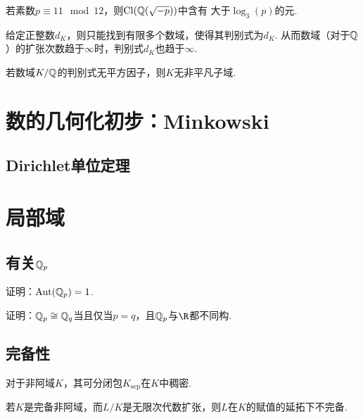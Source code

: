 \begin{exercise}
    若素数$p \equiv 11 \mod 12$，则$\mathrm{Cl}(\mathbb{Q}(\sqrt{-p}))$中含有
    大于$\log_{3}(p)$的元.
\end{exercise}

\begin{exercise}
    给定正整数$d_{K}$，则只能找到有限多个数域，使得其判别式为$d_{K}$.
    从而数域（对于$\mathbb{Q}$）的扩张次数趋于$\infty$时，判别式$d_{K}$也趋于$\infty$.
\end{exercise}

\begin{exercise}
    若数域$K/\mathbb{Q}$的判别式无平方因子，则$K$无非平凡子域.
\end{exercise}

\section{数的几何化初步：Minkowski}

\subsection{Dirichlet单位定理}


\section{局部域}
\subsection{有关$\mathbb{Q}_{p}$}

\begin{exercise}
    证明：$\operatorname{Aut}(\mathbb{Q}_{p}) = 1$.
\end{exercise}

\begin{exercise}
    证明：$\mathbb{Q}_{p} \cong \mathbb{Q}_{q}$当且仅当$p=q$，且$\mathbb{Q}_{p}$与$\R$都不同构.
\end{exercise}


\subsection{完备性}
\begin{exercise}
    对于非阿域$K$，其可分闭包$K_{\mathrm{sep}}$在$K$中稠密.
\end{exercise}

\begin{exercise}
    若$K$是完备非阿域，而$L/K$是无限次代数扩张，则$L$在$K$的赋值的延拓下不完备.
\end{exercise}

